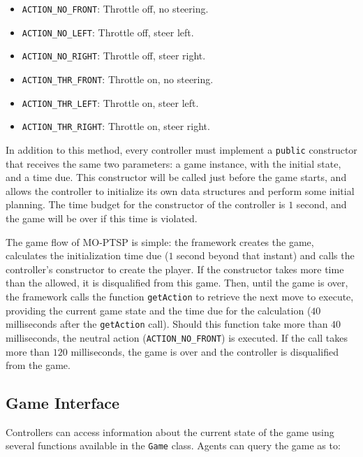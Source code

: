 \documentclass[conference]{IEEEtran}
\newcommand{\code}[1]{{\lstinline!#1!}}
\begin{document}
\begin{itemize}
\item \code{ACTION_NO_FRONT}: Throttle off, no steering.
\item \code{ACTION_NO_LEFT}: Throttle off, steer left.
\item \code{ACTION_NO_RIGHT}: Throttle off, steer right.
\item \code{ACTION_THR_FRONT}: Throttle on, no steering. 
\item \code{ACTION_THR_LEFT}: Throttle on, steer left. 
\item \code{ACTION_THR_RIGHT}: Throttle on, steer right.
\end{itemize}

In addition to this method, every controller must implement a \code{public} constructor that receives the same two parameters: a game instance, with the initial state, and a time due. This constructor will be called just before the game starts, and allows the controller to initialize its own data structures and perform some initial planning. The time budget for the constructor of the controller is $1$ second, and the game will be over if this time is violated.

The game flow of MO-PTSP is simple: the framework creates the game, calculates the initialization time due ($1$ second beyond that instant) and calls the controller's constructor to create the player. If the constructor takes more time than the allowed, it is disqualified from this game. Then, until the game is over, the framework calls the function \code{getAction} to retrieve the next move to execute, providing the current game state and the time due for the calculation ($40$ milliseconds after the \code{getAction} call). Should this function take more than $40$ milliseconds, the neutral action (\code{ACTION_NO_FRONT}) is executed. If the call takes more than $120$ milliseconds, the game is over and the controller is disqualified from the game.


\subsection{Game Interface} \label{ssec:cont}

Controllers can access information about the current state of the game using several functions available in the \code{Game} class. Agents can query the game as to:
\end{document}
